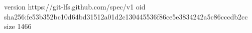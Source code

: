 version https://git-lfs.github.com/spec/v1
oid sha256:fe53b352bc10d64bd31512a01d2c130445536f86ce5e3834242a5c86cccdb2cc
size 1466
